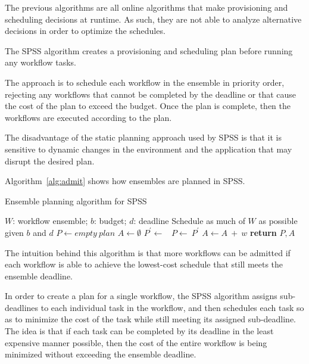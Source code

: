 \documentclass{sig-alternate}
\begin{document}
The previous algorithms are all online algorithms that make provisioning 
and scheduling decisions at runtime. As such, they are not able to analyze 
alternative decisions in order to optimize the schedules.

The SPSS algorithm creates a provisioning and scheduling plan before running 
any workflow tasks.

The approach is to schedule each workflow in the ensemble in priority order, 
rejecting any workflows that cannot be completed by the deadline or that cause 
the cost of the plan to exceed the budget. Once the plan is complete, then the 
workflows are executed according to the plan.

The disadvantage of the static planning approach used by SPSS is that it is 
sensitive to dynamic changes in the environment and the application that may 
disrupt the desired plan.

Algorithm~\ref{alg:admit} shows how ensembles are planned in SPSS.

\begin{algorithm}
\caption{Ensemble planning algorithm for SPSS}
\label{alg:admit}
\begin{algorithmic}[1]
\Require $W$: workflow ensemble; $b$: budget; $d$: deadline
\Ensure Schedule as much of $W$ as possible given $b$ and $d$
    \State $P\gets empty\ plan$
    \State $A\gets \emptyset$ 
        \State $P^\prime \gets$\ 
                \State $P\gets\ P^\prime$ 
                \State $A \gets A\ +\ w$ 
            \EndIf
        \EndIf
    \EndFor
    \State \textbf{return} $P,A$
\EndProcedure
\end{algorithmic} 
\end{algorithm}

The intuition behind this algorithm is that more workflows can be admitted
if each workflow is able to achieve the lowest-cost schedule that still
meets the ensemble deadline.

In order to create a plan for a single workflow, the SPSS algorithm assigns 
sub-deadlines to each individual task in the workflow, and then schedules 
each task so as to minimize the cost of the task while still meeting its 
assigned sub-deadline. The idea is that if each task can be completed by 
its deadline in the least expensive manner possible, then the cost of the
entire workflow is being minimized without exceeding the ensemble deadline.
\end{document}
